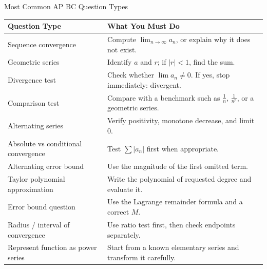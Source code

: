 \documentclass[11pt]{article}
\begin{document}
\vspace{0.8em}

\begin{summarybox}{Most Common AP BC Question Types}
\renewcommand{\arraystretch}{1.35}
\begin{tabularx}{\textwidth}{@{}p{}X@{}}
\toprule
\textbf{Question Type} & \textbf{What You Must Do} \\
\midrule
Sequence convergence & Compute \(\lim_{n\to\infty} a_n\), or explain why it does not exist. \\

Geometric series & Identify \(a\) and \(r\); if \(|r|<1\), find the sum. \\

Divergence test & Check whether \(\lim a_n\neq 0\). If yes, stop immediately: divergent. \\

Comparison test & Compare with a benchmark such as \(\frac1n\), \(\frac1{n^p}\), or a geometric series. \\

Alternating series & Verify positivity, monotone decrease, and limit \(0\). \\

Absolute vs conditional convergence & Test \(\sum |a_n|\) first when appropriate. \\

Alternating error bound & Use the magnitude of the first omitted term. \\

Taylor polynomial approximation & Write the polynomial of requested degree and evaluate it. \\

Error bound question & Use the Lagrange remainder formula and a correct \(M\). \\

Radius / interval of convergence & Use ratio test first, then check endpoints separately. \\

Represent function as power series & Start from a known elementary series and transform it carefully. \\
\bottomrule
\end{tabularx}
\end{summarybox}

\vspace{0.8em}
\end{document}
